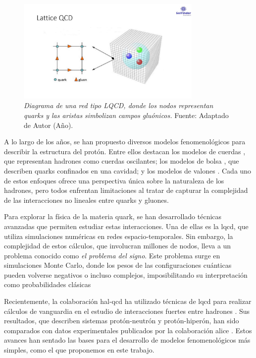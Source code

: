 \begin{figure}[h]
    \centering
    \includegraphics[width=0.8\textwidth]{./Images/LQCD.jpg}
    \caption[Red LQCD]{\emph{Diagrama de una red tipo LQCD, donde los nodos representan quarks y las aristas simbolizan campos gluónicos.} Fuente: Adaptado de Autor (Año).}
    \label{fig:LQCD }
\end{figure}

A lo largo de los años, se han propuesto diversos modelos fenomenológicos para describir la estructura del protón. Entre ellos destacan los modelos de cuerdas \cite{Artru1974, Andersson_1983}, que representan hadrones como cuerdas oscilantes; los modelos de bolsa \cite{AIHPA_1968__8_2_163_0,DeTar_1983}, que describen quarks confinados en una cavidad; y los modelos de valones \cite{Hwa_1981}. Cada uno de estos enfoques ofrece una perspectiva única sobre la naturaleza de los hadrones, pero todos enfrentan limitaciones al tratar de capturar la complejidad de las interacciones no lineales entre quarks y gluones.

Para explorar la física de la materia quark, se han desarrollado técnicas avanzadas que permiten estudiar estas interacciones. Una de ellas es la \gls{lqcd}, que utiliza simulaciones numéricas en redes espacio-temporales. Sin embargo, la complejidad de estos cálculos, que involucran millones de nodos, lleva a un problema conocido como \emph{el problema del signo}. Este problema surge en simulaciones Monte Carlo, donde los pesos de las configuraciones cuánticas pueden volverse negativos o incluso complejos, imposibilitando su interpretación como probabilidades clásicas %

Recientemente, la colaboración \gls{hal-qcd} ha utilizado técnicas de \gls{lqcd} para realizar cálculos de vanguardia en el estudio de interacciones fuertes entre hadrones \cite{Iritani_2019,Hatsuda_2017}. Sus resultados, que describen sistemas protón-neutrón y protón-hiperón, han sido comparados con datos experimentales publicados por la colaboración \gls{alice} \cite{Collaboration2020, Collaboration2021}. Estos avances han sentado las bases para el desarrollo de modelos fenomenológicos más simples, como el que proponemos en este trabajo.


